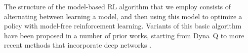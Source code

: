The structure of the model-based RL algorithm that we employ consists of alternating between learning a model, and then using this model to optimize a policy with model-free reinforcement learning. Variants of this basic algorithm have been proposed in a number of prior works, starting from Dyna~Q \cite{dyna} to more recent methods that incorporate deep networks
\cite{stochastic_value_gradients, model_based_value_estimation, uncertainty_driven_imagination, trpo_ensemble}. 
